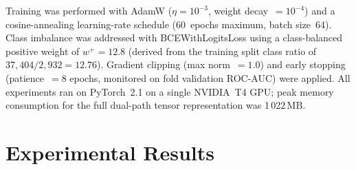 \documentclass[conference,12pt]{IEEEtran}
\begin{document}
\begin{table}[!t]
  \centering
  \caption{DPCT Parameter Count by Architectural Component}
  \label{tab:params}
  \small
  \renewcommand{\arraystretch}{1.1}
\end{table}

Training was performed with AdamW ($\eta = 10^{-3}$,
weight decay~$= 10^{-4}$) and a cosine-annealing learning-rate schedule
(60~epochs maximum, batch size~64).
Class imbalance was addressed with BCEWithLogitsLoss using a
class-balanced positive weight of $w^{+} = 12.8$ (derived from the training
split class ratio of $37{,}404 / 2{,}932 = 12.76$).
Gradient clipping (max norm~$= 1.0$) and early stopping
(patience~$= 8$ epochs, monitored on fold validation ROC-AUC) were applied.
All experiments ran on PyTorch~2.1 on a single NVIDIA~T4 GPU;
peak memory consumption for the full dual-path tensor representation was
1\,022\,MB.

\section{\textbf{Experimental Results}}
\label{sec:results}
\end{document}
